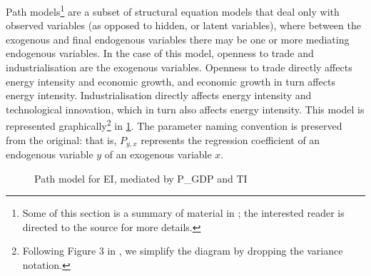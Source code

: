 \documentclass[11pt,a4paper]{article}
\begin{document}
Path models\footnote{ 
Some of this section is a summary of material in \cite{klinePrinciplesPracticeStructural2016}; the interested reader is directed to the source for more details.
} are a subset of structural equation models that deal only with observed variables (as opposed to hidden, or latent variables), where between the exogenous and final endogenous variables there may be one or more mediating endogenous variables.
In the case of this model, openness to trade and industrialisation are the exogenous variables. 
Openness to trade directly affects energy intensity and economic growth, and economic growth in turn affects energy intensity. 
Industrialisation directly affects  energy intensity and technological innovation, which in turn also affects energy intensity.
This model is represented graphically\footnote{
Following Figure 3 in \cite{panHowIndustrializationTrade2019}, we simplify the diagram by dropping the variance notation.
} in \cref{fig:original_model}. 
The parameter naming convention is preserved from the original: that is, $P_{y,x}$ represents the regression coefficient of an endogenous variable $y$ of an exogenous variable $x$.

\begin{figure}[tbp]
\centering
{}
\caption{Path model for EI, mediated by P\_GDP and TI}
\label{fig:original_model}
\end{figure}
\end{document}
